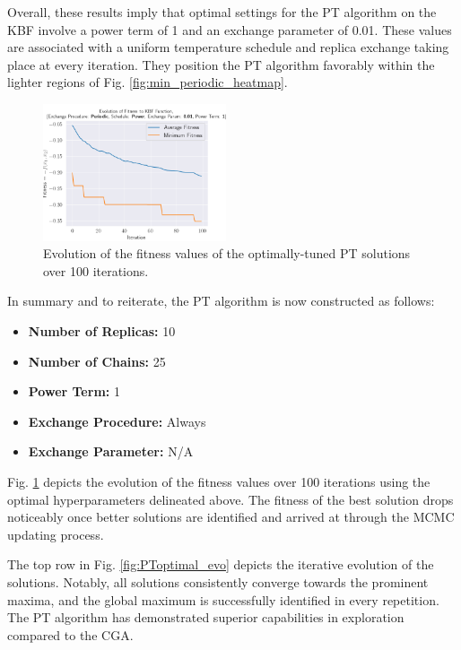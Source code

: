 \documentclass[10pt]{article}
\begin{document}
\begin{multicols}{2}
Overall, these results imply that optimal settings for the PT algorithm on the KBF involve a power term of 1 and an exchange parameter of 0.01. These values are associated with a uniform temperature schedule and replica exchange taking place at every iteration. They position the PT algorithm favorably within the lighter regions of Fig. \ref{fig:min_periodic_heatmap}.

\begin{figure}[H]
    \centering
    \includegraphics[width=0.48\textwidth]{../figures/Permanent Images/0.01_1_Periodic_Fitness.png}
    \captionsetup{justification=centering}
    \caption{Evolution of the fitness values of the optimally-tuned PT solutions over 100 iterations.}
    \label{fig:PToptimal_fitness}
\end{figure}

In summary and to reiterate, the PT algorithm is now constructed as follows:

\begin{itemize}
    \item \textbf{Number of Replicas:} 10
    \item \textbf{Number of Chains:} 25
    \item \textbf{Power Term:} 1
    \item \textbf{Exchange Procedure:} Always
    \item \textbf{Exchange Parameter:} N/A
\end{itemize}

Fig. \ref{fig:PToptimal_fitness} depicts the evolution of the fitness values over 100 iterations using the optimal hyperparameters delineated above. The fitness of the best solution drops noticeably once better solutions are identified and arrived at through the MCMC updating process.

The top row in Fig. \ref{fig:PToptimal_evo} depicts the iterative evolution of the solutions. Notably, all solutions consistently converge towards the prominent maxima, and the global maximum is successfully identified in every repetition. The PT algorithm has demonstrated superior capabilities in exploration compared to the CGA.


\end{multicols}
\end{document}
